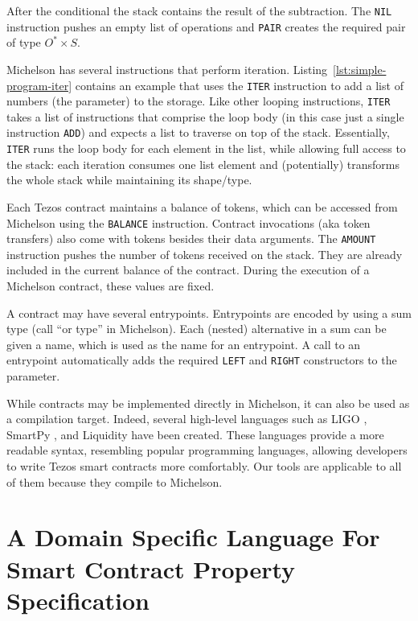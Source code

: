 \documentclass[a4paper,USenglish,cleveref, autoref,anonymous]{lipics-v2021}
\begin{document}
After the conditional the stack contains the result of the
subtraction. The \lstinline|NIL| instruction pushes an empty list of
operations and 
\lstinline|PAIR| creates the required pair of type $O^* \times S$.

Michelson has several instructions that perform
iteration. Listing~\ref{lst:simple-program-iter} contains an example
that uses the \lstinline|ITER| instruction to add a list of numbers
(the parameter) to the storage. Like other looping instructions,
\lstinline|ITER| takes a list of instructions that comprise the loop
body (in this case just a single instruction \lstinline|ADD|) and
expects a list to traverse on top of the stack. Essentially,
\lstinline|ITER| runs the loop body for each element in the list,
while allowing full access to the stack: each iteration consumes
one list element and (potentially) transforms the whole stack
while maintaining its shape/type. 

Each Tezos contract maintains a balance of tokens, which can be
accessed from Michelson using the \lstinline|BALANCE|
instruction. Contract invocations (aka token transfers) also come with
tokens besides their data arguments. The \lstinline|AMOUNT|
instruction pushes the number of tokens received on the stack. They
are already included in the current balance of the contract. During the
execution of a Michelson contract, these values are fixed. 

A contract may have several entrypoints. Entrypoints are encoded by
using a sum type (call ``or type'' in Michelson). Each (nested) alternative in a sum can be
given a name, which is used as the name for an entrypoint. A call to
an entrypoint automatically adds the required \lstinline|LEFT| and
\lstinline|RIGHT| constructors to the parameter.

While contracts may be implemented directly in Michelson, it can also
be used as a compilation target. Indeed, several high-level languages
such as LIGO \cite{ligo}, SmartPy \cite{smartpy}, and Liquidity \cite{liquidity} have been created. These languages provide a more readable syntax, resembling popular
programming languages, allowing developers to write Tezos smart
contracts more comfortably. Our tools are applicable to all of them
because they compile to Michelson.
\lstset{language=Caml}

\section{A Domain Specific Language For Smart Contract Property Specification}
\label{sec:domain-specific-language}
\end{document}
